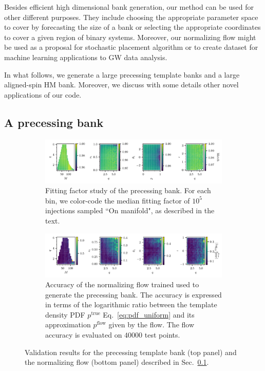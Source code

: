 \documentclass[twocolumn,showpacs,preprintnumbers,nofootinbib,prd,
superscriptaddress,10pt]{revtex4-2}
\begin{document}
Besides efficient high dimensional bank generation, our method can be used for other different purposes. They include choosing the appropriate parameter space to cover by forecasting the size of a bank or selecting the appropriate coordinates to cover a given region of binary systems. Moreover, our normalizing flow might be used as a proposal for stochastic placement algorithm or to create dataset for machine learning applications to GW data analysis.

In what follows, we generate a large precessing template banks and a large aligned-spin HM bank. Moreover, we discuss with some details other novel applications of our code.

\subsection{A precessing bank} \label{sec:precessing_bank}


\begin{figure}[t]
	\centering
	\begin{subfigure}[t]{\textwidth}
		\includegraphics[scale = 1.]{precessing_injections}
		\caption{Fitting factor study of the precessing bank. For each bin, we color-code the median fitting factor of $10^5$ injections sampled ``On manifold", as described in the text.}
	\end{subfigure}
	\begin{subfigure}[t]{\textwidth}
		\includegraphics[scale = 1.]{precessing_flow_accuracy}
		\caption{Accuracy of the normalizing flow trained used to generate the precessing bank. The accuracy is expressed in terms of the logarithmic ratio between the template density PDF $p^\text{true}$ Eq.~\eqref{eq:pdf_uniform} and its approximation $p^\text{flow}$ given by the flow. The flow accuracy is evaluated on $40000$ test points.}
	\end{subfigure}
	\caption{Validation results for the precessing template bank (top panel) and the normalizing flow (bottom panel) described in Sec.~\ref{sec:precessing_bank}.}
	\label{fig:precessing_injections}
\end{figure}
\end{document}

